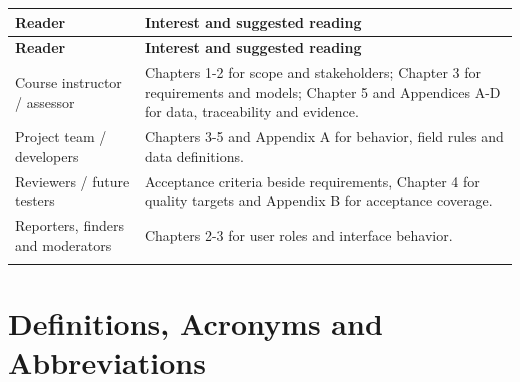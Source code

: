 \documentclass[12pt,a4paper,oneside]{report}
\begin{document}
\begin{longtable}{@{}P{0.29\dimexpr\textwidth-12pt\relax}P{0.71\dimexpr\textwidth-12pt\relax}@{}}

\toprule \textbf{Reader} & \textbf{Interest and suggested reading} \\ \midrule\endfirsthead

\toprule \textbf{Reader} & \textbf{Interest and suggested reading} \\ \midrule\endhead

\bottomrule\endfoot

Course instructor / assessor & Chapters 1-2 for scope and stakeholders; Chapter 3 for requirements and models; Chapter 5 and Appendices A-D for data, traceability and evidence. \\ \addlinespace[3pt]

Project team / developers & Chapters 3-5 and Appendix A for behavior, field rules and data definitions. \\ \addlinespace[3pt]

Reviewers / future testers & Acceptance criteria beside requirements, Chapter 4 for quality targets and Appendix B for acceptance coverage. \\ \addlinespace[3pt]

Reporters, finders and moderators & Chapters 2-3 for user roles and interface behavior. \\ \addlinespace[3pt]

\end{longtable}


\section{Definitions, Acronyms and Abbreviations}
\end{document}
